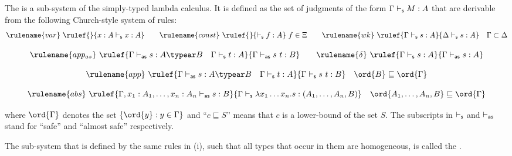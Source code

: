 \begin{definition}\rm
\label{def:safelambda}
\begin{inparaenum}[(i)]
\item The  is a sub-system of the
  simply-typed lambda calculus. It is defined as the set of judgments of the form $\Gamma \vdash_{\sf s} M : A$ that are derivable from the following Church-style system of rules:
$$ \rulename{var} \ \rulef{}{x : A\sentail x : A} \qquad
\rulename{const} \ \rulef{}{\sentail f : A}~f \in \Xi \qquad
\rulename{wk} \ \rulef{\Gamma \sentail s : A}{\Delta \sentail s : A} \quad
\Gamma \subset \Delta$$

$$ \rulename{app_{as}} \ \rulef{\Gamma \asentail s : A\typear B
\quad \Gamma \sentail t : A} {\Gamma \asentail s~t : B}
\qquad
\rulename{\delta} \ \rulef{\Gamma \sentail s : A}{\Gamma \asentail s : A}
$$

$$ \rulename{app} \ \rulef{\Gamma \asentail s : A\typear B
\quad \Gamma \sentail t : A} {\Gamma \sentail s~t : B} \quad \ord{B} \sqsubseteq
\ord{\Gamma}$$

$$ \rulename{abs} \ \rulef{\Gamma, x_1 : A_1, \ldots, x_n : A_n
  \asentail s : B} {\Gamma \sentail \lambda x_1 \ldots x_n . s :
  (A_1, \ldots ,A_n,B)} \quad \ord{A_1, \ldots ,A_n,B} \sqsubseteq
\ord{\Gamma}$$
\smallskip

where $\ord{\Gamma}$ denotes the set $\{ \ord{y} : y \in \Gamma \}$
and ``$c \sqsubseteq S$'' means that $c$ is a lower-bound of the set
$S$. The subscripts in $\vdash_{\sf s}$ and $\vdash_{\sf as}$ stand for ``safe'' and ``almost safe'' respectively.

\noindent \item The sub-system that is defined by the same rules in
(i), such that all types that occur in them are homogeneous, is called
the .
\end{inparaenum}
\end{definition}


